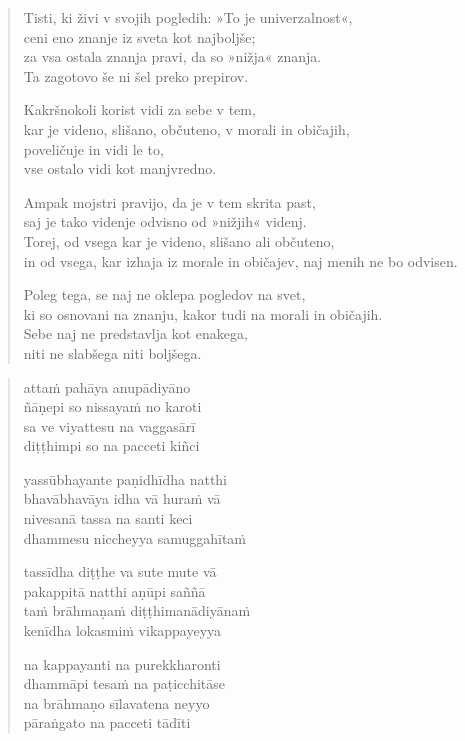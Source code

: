 \begin{verse}


Tisti, ki živi v svojih pogledih: »To je univerzalnost«,\\
ceni eno znanje iz sveta kot najboljše;\\
za vsa ostala znanja pravi, da so »nižja« znanja.\\
Ta zagotovo še ni šel preko prepirov.

Kakršnokoli korist vidi za sebe v tem,\\
kar je videno, slišano, občuteno, v morali in običajih,\\
poveličuje in vidi le to,\\
vse ostalo vidi kot manjvredno.

Ampak mojstri pravijo, da je v tem skrita past,\\
saj je tako videnje odvisno od »nižjih« videnj.\\
Torej, od vsega kar je videno, slišano ali občuteno,\\
in od vsega, kar izhaja iz morale in običajev, naj menih ne bo odvisen.

Poleg tega, se naj ne oklepa pogledov na svet,\\
ki so osnovani na znanju, kakor tudi na morali in običajih.\\
Sebe naj ne predstavlja kot enakega,\\
niti ne slabšega niti boljšega.

\end{verse}


\clearpage
\begin{verse}

attaṁ pahāya anupādiyāno\\
ñāṇepi so nissayaṁ no karoti\\
sa ve viyattesu na vaggasārī\\
diṭṭhimpi so na pacceti kiñci

yassūbhayante paṇidhīdha natthi\\
bhavābhavāya idha vā huraṁ vā\\
nivesanā tassa na santi keci\\
dhammesu niccheyya samuggahītaṁ

tassīdha diṭṭhe va sute mute vā\\
pakappitā natthi aṇūpi saññā\\
taṁ brāhmaṇaṁ diṭṭhimanādiyānaṁ\\
kenīdha lokasmiṁ vikappayeyya

na kappayanti na purekkharonti\\
dhammāpi tesaṁ na paṭicchitāse\\
na brāhmaṇo sīlavatena neyyo\\
pāraṅgato na pacceti tādīti

\end{verse}

